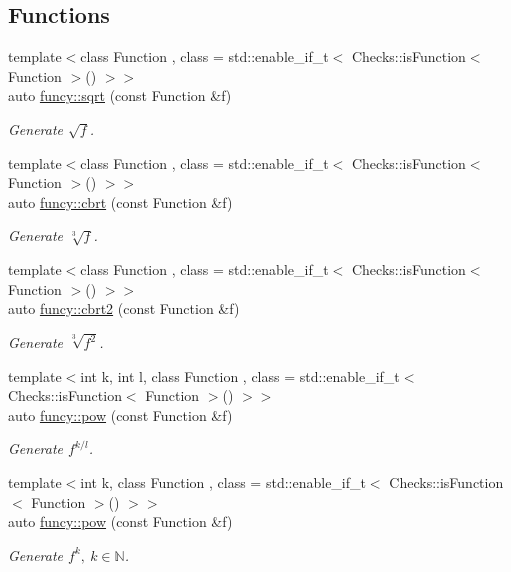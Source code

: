 \subsection*{Functions}
\begin{DoxyCompactItemize}
\item 
{\footnotesize template$<$class Function , class  = std\-::enable\-\_\-if\-\_\-t$<$ Checks\-::is\-Function$<$ Function $>$() $>$$>$ }\\auto \hyperlink{group__CMathGroup_ga1c180bd87b8817342b34d72dddd11266}{funcy\-::sqrt} (const Function \&f)
\begin{DoxyCompactList}\small\item\em Generate $ \sqrt{f} $. \end{DoxyCompactList}\item 
{\footnotesize template$<$class Function , class  = std\-::enable\-\_\-if\-\_\-t$<$ Checks\-::is\-Function$<$ Function $>$() $>$$>$ }\\auto \hyperlink{group__CMathGroup_gae8e97f84bd4000935069a87133173d4c}{funcy\-::cbrt} (const Function \&f)
\begin{DoxyCompactList}\small\item\em Generate $ \sqrt[3]{f} $. \end{DoxyCompactList}\item 
{\footnotesize template$<$class Function , class  = std\-::enable\-\_\-if\-\_\-t$<$ Checks\-::is\-Function$<$ Function $>$() $>$$>$ }\\auto \hyperlink{group__CMathGroup_ga3a4ba572754c0310c41949f2a4091046}{funcy\-::cbrt2} (const Function \&f)
\begin{DoxyCompactList}\small\item\em Generate $ \sqrt[3]{f^2}$. \end{DoxyCompactList}\item 
{\footnotesize template$<$int k, int l, class Function , class  = std\-::enable\-\_\-if\-\_\-t$<$ Checks\-::is\-Function$<$ Function $>$() $>$$>$ }\\auto \hyperlink{group__CMathGroup_gaa667967d67586d6d5fc733a978f9ab06}{funcy\-::pow} (const Function \&f)
\begin{DoxyCompactList}\small\item\em Generate $ f^{k/l} $. \end{DoxyCompactList}\item 
{\footnotesize template$<$int k, class Function , class  = std\-::enable\-\_\-if\-\_\-t$<$ Checks\-::is\-Function$<$ Function $>$() $>$$>$ }\\auto \hyperlink{group__CMathGroup_ga8e9aacbacd848ce8c87ceba957a666a7}{funcy\-::pow} (const Function \&f)
\begin{DoxyCompactList}\small\item\em Generate $ f^k,\ k\in\mathbb{N}$. \end{DoxyCompactList}\end{DoxyCompactItemize}
